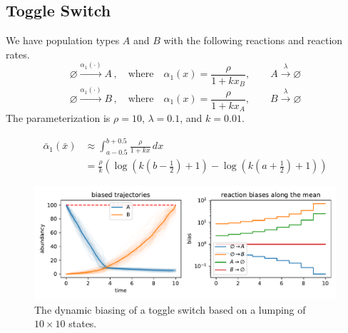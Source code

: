 \subsection{Toggle Switch}
\begin{model}\label{model:hill_toggle_rare}
We have population types $A$ and $B$ with the following reactions and reaction rates.
$$ \varnothing \xrightarrow{\alpha_1(\cdot)} A\,,\quad \text{where}\quad \alpha_1(x) = \frac{\rho}{1 + k x_B},
\qquad A \xrightarrow\lambda \varnothing $$
$$ \varnothing \xrightarrow{\alpha_1(\cdot)} B\,,\quad \text{where}\quad \alpha_1(x) = \frac{\rho}{1 + k x_A},
\qquad B \xrightarrow\lambda \varnothing $$
The parameterization is $\rho=10$, $\lambda=0.1$, and $k=0.01$.
\end{model}
\[
\begin{split}
    \bar{\alpha}_1(\bar{x})&\approx\int_{a-0.5}^{b+0.5} \frac{\rho}{1 + kx}\, dx\\
    &= \frac{\rho}{k} \left(\log{\left(k\left(b - \frac{1}{2}\right) + 1\right)} - \log{\left(k\left(a + \frac{1}{2}\right) + 1 \right)} \right)
\end{split}
\]
\begin{figure}[htb]
    \centering
    \includegraphics[width=\textwidth]{gfx/hill_toggle_is.pdf}
    \caption[Dynamic biasing for the toggle switch]{\label{fig:hill_rare}The dynamic biasing of a toggle switch based on a lumping of $10\times 10$ states.}
\end{figure}
